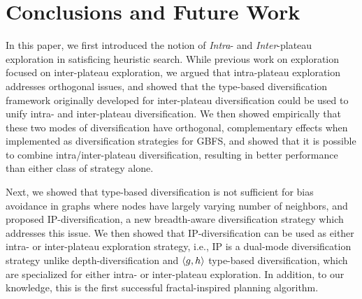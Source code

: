 


\section{Conclusions and Future Work}

In this paper, we first introduced the notion of \emph{Intra}- and
\emph{Inter}-plateau exploration in satisficing heuristic search.
While  previous work on exploration focused on inter-plateau exploration,
we argued that intra-plateau exploration addresses orthogonal issues, and showed that 
the type-based diversification framework originally developed for inter-plateau diversification could be used to unify intra- and inter-plateau diversification.
We then showed empirically that these two modes of diversification have 
orthogonal, complementary effects when implemented as diversification strategies for GBFS, %
and showed that it is possible to combine intra/inter-plateau diversification, 
resulting in better performance than either class of strategy alone.

Next, we showed that type-based diversification is not sufficient for bias avoidance in graphs where nodes have largely varying number of neighbors, and proposed IP-diversification, a new breadth-aware diversification strategy which addresses this issue. We then showed that IP-diversification can be used as either intra- or inter-plateau exploration strategy, i.e., IP is a dual-mode diversification strategy unlike depth-diversification and ${\left<g,h\right>}$ type-based diversification, which are specialized for either intra- or inter-plateau exploration. %
In addition, to our knowledge, this is the first successful fractal-inspired planning algorithm.

